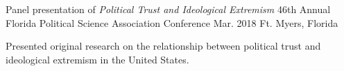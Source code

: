 \begin{cventries}
  \cventry
    {Panel presentation of \emph{Political Trust and Ideological Extremism}} %
    {46th Annual Florida Political Science Association Conference} %
    {Mar. 2018} %
    {Ft. Myers, Florida} %
    {
      \begin{cvitems} %
        \item {Presented original research on the relationship between political trust and ideological extremism in the United States.}
      \end{cvitems}
    }


\end{cventries}
